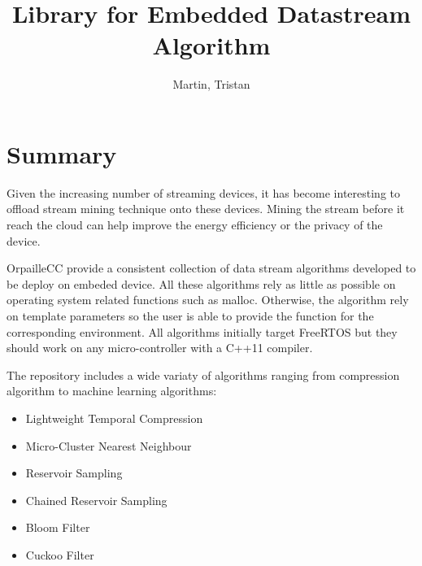 \documentclass{article}
\title{Library for Embedded Datastream Algorithm}
\author{Martin, Tristan}
\begin{document}
\maketitle
\section{Summary}
Given the increasing number of streaming devices, it has become interesting to
offload stream mining technique onto these devices. Mining the stream before it
reach the cloud can help improve the energy efficiency or the privacy of the
device.

OrpailleCC provide a consistent collection of data stream algorithms developed to be
deploy on embeded device.  All these algorithms rely as little as possible on
operating system related functions such as malloc. Otherwise, the algorithm
rely on template parameters so the user is able to provide the function for the
corresponding environment.
All algorithms initially target FreeRTOS \cite{freertos} but they should work
on any micro-controller with a C++11 compiler. 

The repository includes a wide variaty of algorithms ranging from compression
algorithm to machine learning algorithms:
\begin{itemize}
	\item Lightweight Temporal Compression \cite{ltc}
	\item Micro-Cluster Nearest Neighbour \cite{mc-nn}
	\item Reservoir Sampling \cite{reservoir_sampling}
	\item Chained Reservoir Sampling \cite{chained_reservoir_sampling}
	\item Bloom Filter \cite{bloom}
	\item Cuckoo Filter \cite{cuckoo_filter}
\end{itemize}

\end{document}
